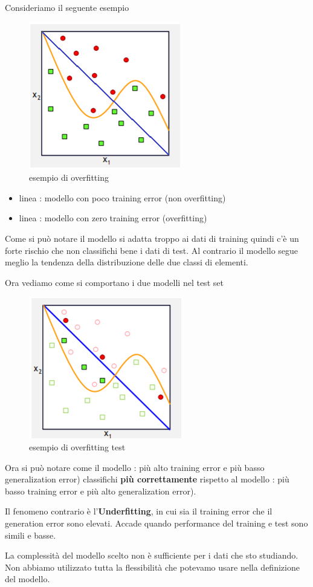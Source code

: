 Consideriamo il seguente esempio
\begin{figure}[H]
	\centering
	\includegraphics[height=0.3 \linewidth]{classification/pict/overfitting.png}
	\caption{esempio di overfitting}
\end{figure}
\begin{itemize}
	\item linea {\color{blue}{blu}}: modello con poco training error (non overfitting)
	\item linea {\color{orange}{arancione}}: modello con zero training error (overfitting)
\end{itemize}
Come si può notare il modello {\color{orange}{arancione}} si adatta troppo ai dati di training quindi c'è un forte rischio che non classifichi bene i dati di test. Al contrario il modello {\color{blue}{blu}} segue meglio la tendenza della distribuzione delle due classi di elementi.

Ora vediamo come si comportano i due modelli nel test set
\begin{figure}[H]
	\centering
	\includegraphics[height=0.3 \linewidth]{classification/pict/overfitting_test.png}
	\caption{esempio di overfitting test}
\end{figure}
Ora si può notare come il modello {\color{blue}{blu}}: più alto training error e più basso generalization error) classifichi \textbf{più correttamente} rispetto al modello {\color{orange}{arancione}}: più basso training error e più alto generalization error).

\begin{defn}
Il fenomeno contrario \`e l'\textbf{Underfitting}, in cui sia il training error che il generation error sono elevati. Accade quando performance del training e test sono simili e basse.
\end{defn}
La complessit\`a del modello scelto non \`e sufficiente per i dati che sto studiando. Non abbiamo utilizzato tutta la flessibilit\`a che potevamo usare nella definizione del modello.

